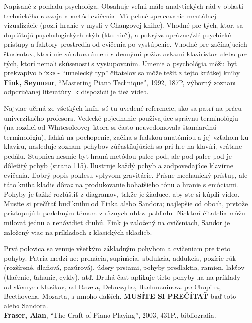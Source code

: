 \documentclass[11pt,a4paper]{book}
\begin{document}
Napísané z pohľadu psychológa. Obsahuje veľmi málo analytických rád v oblasti technického rozvoja a metód cvičenia. Má pekné spracovanie mentálnej vizualizácie (pozri hranie v mysli v Changovej knihe). Vhodné pre tých, ktorí sa dopúšťajú psychologických chýb (kto nie?), a pokrýva správne/zlé psychické prístupy a faktory prostredia od cvičenia po vystúpenie. Vhodné pre začínajúcich študentov, ktorí nie sú oboznámení s dennými požiadavkami klaviristov alebo pre tých, ktorí nemali skúsenosti s vystupovaním. Umenie a psychológia môžu byť prekvapivo blízke - “umelecký typ” čitateľov sa môže tešiť z tejto krátkej knihy 
\medskip\\
\textbf{\hypertarget{r:fink}{Fink, Seymour}}, “Mastering Piano Technique”, 1992, 187P, výborný zoznam odporúčanej literatúry; k dispozícii je tiež video. 

Najviac učená zo všetkých kníh, sú tu uvedené referencie, ako sa patrí na prácu univerzitného profesora. Vedecké pojednanie používajúce správnu terminológiu (na rozdiel od Whitesideovej, ktorá si často neuvedomovala štandardnú terminológiu), ľahká na pochopenie, začína s ľudskou anatómiou a jej vzťahom ku klavíru, nasleduje zoznam pohybov zúčastňujúcich sa pri hre na klavíri, vrátane pedálu. Stupnica nesmie byť hraná metódou palec pod, ale pod palec pod je dôležitý pohyb (strana 115). Ilustruje každý pohyb a zodpovedajúce klavírne cvičenia. Dobrý popis poklesu vplyvom gravitácie. Prísne mechanický prístup, ale táto kniha kladie dôraz na produkovanie bohatšieho tónu a hranie s emóciami. Pohyby je ťažké rozlúštiť z diagramov, takže je žiaduce, aby ste si kúpili video. Musíte si prečítať buď knihu od Finka alebo Sandora; najlepšie od oboch, pretože pristupujú k podobným témam z rôznych uhlov pohľadu. Niektorí čitatelia môžu milovať jednu a nenávidieť druhú. Fink je založený na cvičeniach, Sandor je založený viac na príkladoch z klasických skladieb. 

Prvá polovica sa venuje všetkým základným pohybom a cvičeniam pre tieto pohyby. Patria medzi ne: pronácia, supinácia, abdukcia, addukcia, pozície rúk (rozšírené, dlaňová, pazúrová), údery prstami, pohyby predlaktia, ramien, lakťov (tlačenie, ťahanie, cykly), atď. Druhá časť aplikuje tieto pohyby na na príklady od slávnych klasikov, od Ravela, Debussyho, Rachmaninova po Chopina, Beethovena, Mozarta, a mnoho ďalších. \textbf{MUSÍTE SI PREČÍTAŤ} buď toto alebo Sandora. 
\medskip\\
\textbf{\hypertarget{r:fraser}{Fraser, Alan}}, “The Craft of Piano Playing”, 2003, 431P., bibliografia. 
\end{document}
